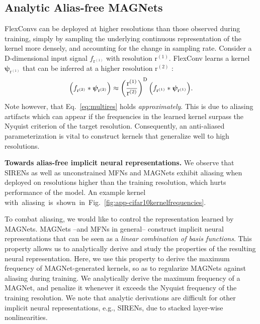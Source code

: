 \documentclass{article} \usepackage{iclr2022_conference,times}
\begin{document}
\subsection{Analytic Alias-free MAGNets}
\label{sec:crtraining}
\vspace{-1mm}
FlexConvs can be deployed at higher resolutions than those observed during training, simply by sampling the underlying continuous representation of the kernel more densely, and accounting for the change in sampling rate. Consider a $\mathrm{D}$-dimensional input signal $f_{\mathrm{r}^{(1)}}$ with resolution $\mathrm{r}^{(1)}$. FlexConv learns a kernel $\boldsymbol{\psi}_{\mathrm{r}^{(1)}}$ that can be inferred at a higher resolution $\mathrm{r}^{(2)}$ \citep{romero2021ckconv}:  
\begin{equation}
\setlength{\abovedisplayskip}{0pt}
\setlength{\belowdisplayskip}{1pt}
    \Big(f_{\mathrm{r}^{(2)}} * \boldsymbol{\psi}_{\mathrm{r}^{(2)}}\Big) \approx \left(\frac{\mathrm{r}^{(1)}}{\mathrm{r}^{(2)}}\right)^{\mathrm{D}} \Big(f_{\mathrm{r}^{(1)}} * \boldsymbol{\psi}_{\mathrm{r}^{(1)}}\Big). \label{eq:multires}
\end{equation}
Note however, that Eq.~\ref{eq:multires} holds \textit{approximately}. This is due to aliasing artifacts which can appear if the frequencies in the learned kernel surpass the Nyquist criterion of the target resolution. Consequently, an anti-aliased parameterization is vital to construct kernels that generalize well to high resolutions.

\textbf{Towards alias-free implicit neural representations.} We observe that SIRENs as well as unconstrained MFNs and MAGNets exhibit aliasing when deployed on resolutions higher than the training resolution, which hurts performance of the model. An example kernel with~aliasing~is~shown~in~Fig.~\ref{fig:app-cifar10kernelfrequencies}.


To combat aliasing, we would like to control the representation learned by MAGNets. MAGNets --and MFNs in general-- construct implicit neural representations that can be seen as a \textit{linear combination of basis functions}. This property allows us to analytically derive and study the properties of the resulting neural representation. Here, we use this property to derive the maximum frequency of MAGNet-generated kernels, so as to regularize MAGNets against aliasing during training. We analytically derive the maximum frequency of a MAGNet, and penalize it whenever it exceeds the Nyquist frequency of the training resolution. We note that analytic derivations are difficult for other implicit neural representations, e.g., SIRENs, due to stacked layer-wise nonlinearities. 
\end{document}
